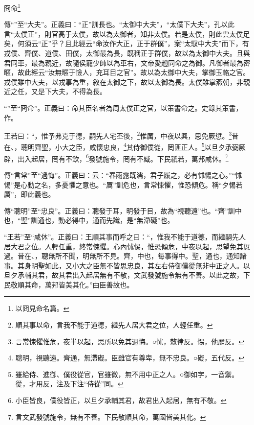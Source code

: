 冏命\footnote{以冏見命名篇。}


{\noindent\zhuan{}\fzbyks 傳“”至“大夫”。正義曰：“正”訓長也。“太御中大夫”，“太僕下大夫”，孔以此言“太僕正”，則官高于太僕，故以為太御者，知非太僕。若是太僕，則此雲太僕足矣，何須云“正”乎？且此經云“命汝作大正，正于群僕”，案“太馭中大夫”而下，有戎僕、齊僕、道僕、田僕，太御最為長，既稱正于群僕，故以為太御中大夫。且與君同車，最為親近，故隨侯寵少師以為車右，文帝愛趙同命之為御。凡御者最為密暱，故此經云“汝無暱于憸人，充耳目之官”。故以為太御中大夫，掌御玉輅之官。戎僕雖中大夫，以戎事為重，敘在太御之下，故以太御為長。太僕雖掌燕朝，非親近之任，又是下大夫，不得為長。 \par}

{\noindent\shu{}\fzkt “”至“冏命”。正義曰：命其臣名者為周太僕正之官，以策書命之。史錄其策書，作。 \par}

王若曰：“，惟予弗克于德，嗣先人宅丕後，\footnote{順其事以命，言我不能于道德，繼先人居大君之位，人輕任重。}惟厲，中夜以興，思免厥愆。\footnote{言常悚懼惟危，夜半以起，思所以免其過悔。○怵，敕律反。惕，他歷反。}昔在、，聰明齊聖，小大之臣，咸懷忠良，\footnote{聰明，視聽遠。齊通，無滯礙。臣雖官有尊卑，無不忠良。○礙，五代反。}其侍御僕從，罔匪正人。\footnote{雖給侍、進御、僕役從官，官雖微，無不用中正之人。○御如字，一音禦。從，才用反，注及下注“侍從”同。}以旦夕承弼厥辟，出入起居，罔有不欽，\footnote{小臣皆良，僕役皆正，以旦夕承輔其君，故君出入起居，無有不敬。}發號施令，罔有不臧。下民祇若，萬邦咸休。\footnote{言文武發號施令，無有不善。下民敬順其命，萬國皆美其化。}


{\noindent\zhuan{}\fzbyks 傳“言常”至“過悔”。正義曰：云：“春雨露既濡，君子履之，必有怵惕之心。”“怵惕”是心動之名，多憂懼之意也。“厲”訓危也，言常悚懼，惟恐傾危。稱“夕惕若厲”，即此義也。 \par}

{\noindent\zhuan{}\fzbyks 傳“聰明”至“忠良”。正義曰：聰發于耳，明發于目，故為“視聽遠”也。“齊”訓中也，“聖”訓通也，動必得中，通而先識，是“無滯礙”也。 \par}

{\noindent\shu{}\fzkt “王若”至“咸休”。正義曰：王順其事而呼之曰：“，惟我不能于道德，而繼嗣先人居大君之位。人輕任重，終常悚懼。心內怵惕，惟恐傾危，中夜以起，思望免其愆過。昔在、，聰無所不聞，明無所不見。齊，中也，每事得中。聖，通也，通知諸事。其身明聖如此，又小大之臣無不皆思忠良，其左右侍御僕從無非中正之人。以旦夕承輔其君，故其君出入起居無有不敬，文武發號施令無有不善。以此之故，下民敬順其命，萬邦皆美其化。”由臣善故也。 \par}


